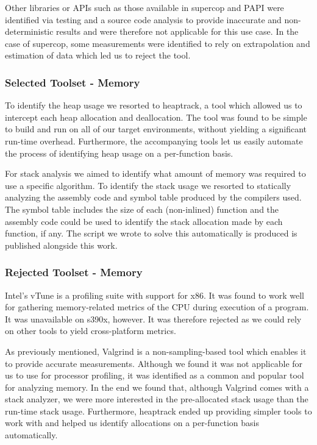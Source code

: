 Other libraries or APIs such as those available in \gls{supercop} and PAPI were identified via testing and a source code analysis to provide inaccurate and non-deterministic results and were therefore not applicable for this use case. In the case of \gls{supercop}, some measurements were identified to rely on extrapolation and estimation of data which led us to reject the tool.

\subsubsection{Selected Toolset - Memory}
\label{section:method:experiment:phase1:selected-toolset-memory}

To identify the heap usage we resorted to heaptrack, a tool which allowed us to intercept each heap allocation and deallocation. The tool was found to be simple to build and run on all of our target environments, without yielding a significant run-time overhead. Furthermore, the accompanying tools let us easily automate the process of identifying heap usage on a per-function basis.

For stack analysis we aimed to identify what amount of memory was required to use a specific algorithm. To identify the stack usage we resorted to statically analyzing the assembly code and symbol table produced by the compilers used. The symbol table includes the size of each (non-inlined) function and the assembly code could be used to identify the stack allocation made by each function, if any. The script we wrote to solve this automatically is produced is published alongside this work.

\subsubsection{Rejected Toolset - Memory}
\label{section:method:experiment:phase1:rejected-toolset-memory}

Intel's vTune is a profiling suite with support for x86. It was found to work well for gathering memory-related metrics of the CPU during execution of a program. It was unavailable on \gls{s390x}, however. It was therefore rejected as we could rely on other tools to yield cross-platform metrics. 

As previously mentioned, Valgrind is a non-sampling-based tool which enables it to provide accurate measurements. Although we found it was not applicable for us to use for processor profiling, it was identified as a common and popular tool for analyzing memory. In the end we found that, although Valgrind comes with a stack analyzer, we were more interested in the pre-allocated stack usage than the run-time stack usage. Furthermore, heaptrack ended up providing simpler tools to work with and helped us identify allocations on a per-function basis automatically.

